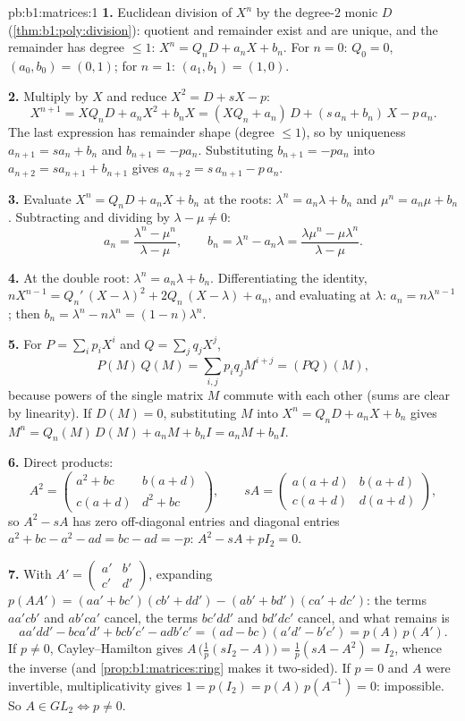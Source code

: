 \begin{solution}{pb:b1:matrices:1}
\textbf{1.} Euclidean division of $X^n$ by the degree-$2$ monic
$D$ (\cref{thm:b1:poly:division}): quotient and remainder exist
and are unique, and the remainder has degree $\leq 1$: $X^n =
Q_n D + a_n X + b_n$. For $n = 0$: $Q_0 = 0$, $(a_0, b_0) = (0,
1)$; for $n = 1$: $(a_1, b_1) = (1, 0)$.

\textbf{2.} Multiply by $X$ and reduce $X^2 = D + sX - p$:
\[
X^{n+1} = X Q_n D + a_n X^2 + b_n X
= (X Q_n + a_n)\,D + (s\,a_n + b_n)\,X - p\,a_n .
\]
The last expression has remainder shape (degree $\leq 1$), so by
uniqueness $a_{n+1} = s a_n + b_n$ and $b_{n+1} = -p a_n$.
Substituting $b_{n+1} = -pa_n$ into $a_{n+2} = s a_{n+1} +
b_{n+1}$ gives $a_{n+2} = s\,a_{n+1} - p\,a_n$.

\textbf{3.} Evaluate $X^n = Q_n D + a_n X + b_n$ at the roots:
$\lambda^n = a_n\lambda + b_n$ and $\mu^n = a_n\mu + b_n$.
Subtracting and dividing by $\lambda - \mu \neq 0$:
\[
a_n = \frac{\lambda^n - \mu^n}{\lambda - \mu},
\qquad
b_n = \lambda^n - a_n\lambda
= \frac{\lambda\mu^n - \mu\lambda^n}{\lambda - \mu} .
\]

\textbf{4.} At the double root: $\lambda^n = a_n\lambda + b_n$.
Differentiating the identity, $nX^{n-1} = Q_n'\,(X - \lambda)^2
+ 2Q_n\,(X - \lambda) + a_n$, and evaluating at $\lambda$: $a_n
= n\lambda^{n-1}$; then $b_n = \lambda^n - n\lambda^{n} = (1 -
n)\lambda^{n}$.

\textbf{5.} For $P = \sum_i p_i X^i$ and $Q = \sum_j q_j X^j$,
\[
P(M)\,Q(M) = \sum_{i,j} p_i q_j M^{i+j} = (PQ)(M),
\]
because powers of the single matrix $M$ commute with each other
(sums are clear by linearity). If $D(M) = 0$, substituting $M$
into $X^n = Q_n D + a_n X + b_n$ gives $M^n = Q_n(M)\,D(M) + a_n
M + b_n I = a_n M + b_n I$.

\textbf{6.} Direct products:
\[
A^2 = \begin{pmatrix}
a^2 + bc & b(a + d)\\
c(a + d) & d^2 + bc
\end{pmatrix},
\qquad
s A = \begin{pmatrix}
a(a+d) & b(a+d)\\
c(a+d) & d(a+d)
\end{pmatrix},
\]
so $A^2 - sA$ has zero off-diagonal entries and diagonal entries
$a^2 + bc - a^2 - ad = bc - ad = -p$: $A^2 - sA + pI_2 = 0$.

\textbf{7.} With $A' = \begin{pmatrix} a' & b'\\ c' &
d'\end{pmatrix}$, expanding $p(AA') = (aa' + bc')(cb' + dd') -
(ab' + bd')(ca' + dc')$: the terms $aa'cb'$ and $ab'ca'$ cancel,
the terms $bc'dd'$ and $bd'dc'$ cancel, and what remains is
\[
aa'dd' - bca'd' + bcb'c' - adb'c'
= (ad - bc)(a'd' - b'c') = p(A)\,p(A').
\]
If $p \neq 0$, Cayley--Hamilton gives $A\,\bigl(\tfrac1p(sI_2 -
A)\bigr) = \tfrac1p(sA - A^2) = I_2$, whence the inverse (and
\cref{prop:b1:matrices:ring} makes it two-sided). If $p = 0$ and
$A$ were invertible, multiplicativity gives $1 = p(I_2) =
p(A)\,p(A^{-1}) = 0$: impossible. So $A \in GL_2 \iff p \neq 0$.


\end{solution}
